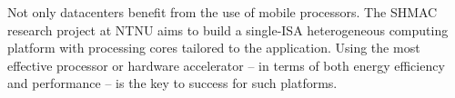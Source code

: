 
Not only datacenters benefit from the use of mobile processors. The SHMAC
research project at NTNU aims to build a single-ISA heterogeneous computing
platform with processing cores tailored to the application. Using the most
effective processor or hardware accelerator -- in terms of both energy efficiency
and performance -- is the key to success for such platforms.



